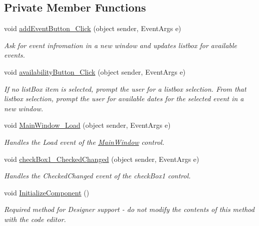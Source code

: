 \subsection*{Private Member Functions}
\begin{DoxyCompactItemize}
\item 
void \hyperlink{classProject1_1_1MainWindow_acddeca5d53ed4be2a81351d1681b4cb5}{add\+Event\+Button\+\_\+\+Click} (object sender, Event\+Args e)
\begin{DoxyCompactList}\small\item\em Ask for event infromation in a new window and updates listbox for available events. \end{DoxyCompactList}\item 
void \hyperlink{classProject1_1_1MainWindow_a70b3092e895f756ceda7a95309581fe5}{availability\+Button\+\_\+\+Click} (object sender, Event\+Args e)
\begin{DoxyCompactList}\small\item\em If no list\+Box item is selected, prompt the user for a listbox selection. From that listbox selection, prompt the user for available dates for the selected event in a new window. \end{DoxyCompactList}\item 
void \hyperlink{classProject1_1_1MainWindow_a31c174049fa92aa29587cf81f7749bd3}{Main\+Window\+\_\+\+Load} (object sender, Event\+Args e)
\begin{DoxyCompactList}\small\item\em Handles the Load event of the \hyperlink{classProject1_1_1MainWindow}{Main\+Window} control. \end{DoxyCompactList}\item 
void \hyperlink{classProject1_1_1MainWindow_a9204f8ca23668b22fa23b4fa44b3ae67}{check\+Box1\+\_\+\+Checked\+Changed} (object sender, Event\+Args e)
\begin{DoxyCompactList}\small\item\em Handles the Checked\+Changed event of the check\+Box1 control. \end{DoxyCompactList}\item 
void \hyperlink{classProject1_1_1MainWindow_a3062c1009a2a7a443176cf874520eebe}{Initialize\+Component} ()
\begin{DoxyCompactList}\small\item\em Required method for Designer support -\/ do not modify the contents of this method with the code editor. \end{DoxyCompactList}\end{DoxyCompactItemize}
